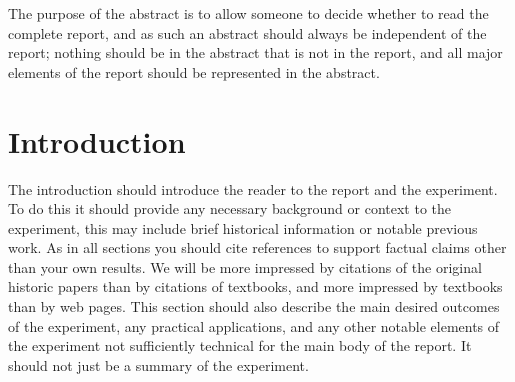 \documentclass[11pt]{article} %
\begin{document}
\begin{titlepage}
 The purpose of the abstract is to allow someone to decide whether to read the complete report, and as such an abstract should always be independent of the report; nothing should be in the abstract that is not in the report, and all major elements of the report should be represented in the abstract.


\end{titlepage}
\clearpage
{} %
\setcounter{page}{2} %

\newpage %

\section{Introduction} 
\label{intro}

The introduction should introduce the reader to the report and the experiment. To do this it should provide any necessary background or context to the experiment, this may include brief historical information or notable previous work. As in all sections you should cite references to support factual claims other than your own results. We will be more impressed by citations of the original historic papers than by citations of textbooks, and more impressed by textbooks than by web pages. This section should also describe the main desired outcomes of the experiment, any practical applications, and any other notable elements of the experiment not sufficiently technical for the main body of the report. It should not just be a summary of the experiment.\\
\end{document}
